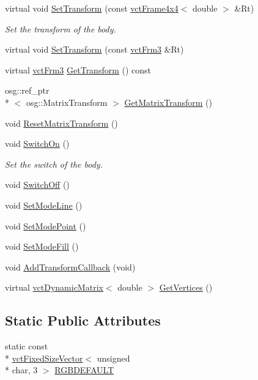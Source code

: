 \begin{DoxyCompactItemize}
\item 
virtual void \hyperlink{classosa_o_s_g_body_a36cf781f0130e65f4f15d5eccf4ec2d6}{Set\-Transform} (const \hyperlink{classvct_frame4x4}{vct\-Frame4x4}$<$ double $>$ \&Rt)
\begin{DoxyCompactList}\small\item\em Set the transform of the body. \end{DoxyCompactList}\item 
virtual void \hyperlink{classosa_o_s_g_body_a61410eae63510e4ba7fe78f661c4610c}{Set\-Transform} (const \hyperlink{vct_transformation_types_8h_a81feda0a02c2d1bc26e5553f409fed20}{vct\-Frm3} \&Rt)
\item 
virtual \hyperlink{vct_transformation_types_8h_a81feda0a02c2d1bc26e5553f409fed20}{vct\-Frm3} \hyperlink{classosa_o_s_g_body_ac22959f804a2dc15719ec629ad07279d}{Get\-Transform} () const 
\item 
osg\-::ref\-\_\-ptr\\*
$<$ osg\-::\-Matrix\-Transform $>$ \hyperlink{classosa_o_s_g_body_abcc307546662a42733de2dea2e10e851}{Get\-Matrix\-Transform} ()
\item 
void \hyperlink{classosa_o_s_g_body_ab479ffc60d72ed0020df994697d32d30}{Reset\-Matrix\-Transform} ()
\item 
void \hyperlink{classosa_o_s_g_body_a9a343ad069313433173693e26c14dce8}{Switch\-On} ()
\begin{DoxyCompactList}\small\item\em Set the switch of the body. \end{DoxyCompactList}\item 
void \hyperlink{classosa_o_s_g_body_a11af6fd2348d929acc980912752600b8}{Switch\-Off} ()
\item 
void \hyperlink{classosa_o_s_g_body_ac39ca380d1e93ed69d5fc8f0712372fc}{Set\-Mode\-Line} ()
\item 
void \hyperlink{classosa_o_s_g_body_a4d09a9ed74fa9e9a4df4c391ff209922}{Set\-Mode\-Point} ()
\item 
void \hyperlink{classosa_o_s_g_body_a45017ba1447b30b209a442535f8478ff}{Set\-Mode\-Fill} ()
\item 
void \hyperlink{classosa_o_s_g_body_ab449b4711f73c026e12d5909a1862d23}{Add\-Transform\-Callback} (void)
\item 
virtual \hyperlink{classvct_dynamic_matrix}{vct\-Dynamic\-Matrix}$<$ double $>$ \hyperlink{classosa_o_s_g_body_ad881ba711ad450edb98bb909fe1a7052}{Get\-Vertices} ()
\end{DoxyCompactItemize}
\subsection*{Static Public Attributes}
\begin{DoxyCompactItemize}
\item 
static const \\*
\hyperlink{classvct_fixed_size_vector}{vct\-Fixed\-Size\-Vector}$<$ unsigned \\*
char, 3 $>$ \hyperlink{classosa_o_s_g_body_a1fb439b90b8d0277e28240e35de006dd}{R\-G\-B\-D\-E\-F\-A\-U\-L\-T}
\end{DoxyCompactItemize}
